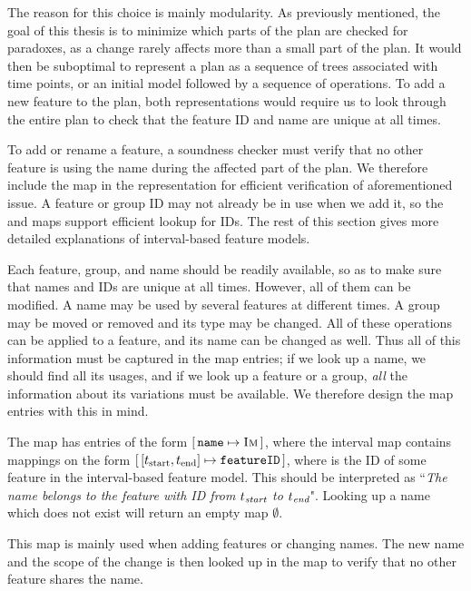 The reason for this choice is mainly modularity. As previously mentioned, the goal of this thesis is to minimize which parts of the plan are checked for paradoxes, as a change rarely affects more than a small part of the plan. It would then be suboptimal to represent a plan as a sequence of trees associated with time points, or an initial model followed by a sequence of operations. To add a new feature to the plan, both representations would require us to look through the entire plan to check that the feature ID and name are unique at all times.

To add or rename a feature, a soundness checker must verify that no other feature is using the name during the affected part of the plan. We therefore include the \names{} map in the representation for efficient verification of aforementioned issue. A feature or group ID may not already be in use when we add it, so the \features{} and \groups{} maps support efficient lookup for IDs. The rest of this section gives more detailed explanations of interval-based feature models.

Each feature, group, and name should be readily available, so as to make sure that names and IDs are unique at all times. However, all of them can be modified. A name may be used by several features at different times. A group may be moved or removed and its type may be changed. All of these operations can be applied to a feature, and its name can be changed as well. Thus all of this information must be captured in the map entries; if we look up a name, we should find all its usages, and if we look up a feature or a group, \emph{all} the information about its variations must be available. We therefore design the map entries with this in mind.

The \names{} map has entries of the form $[ \,\texttt{name} \mapsto \textsc{Im}\, ]$, where the interval map  contains mappings on the form $\intervalmapping{t_\text{start}}{t_\text{end}}{\var{featureID}}$, where  is the ID of some feature in the interval-based feature model. This should be interpreted as ``\emph{The name \emph{} belongs to the feature with ID \emph{} from $t_{\emph{\text{start}}}$ to $t_{\emph{\text{end}}}$}". Looking up a name which does not exist will return an empty map $\emptyset$. 

This map is mainly used when adding features or changing names. The new name and the scope of the change is then looked up in the \names{} map to verify that no other feature shares the name.

